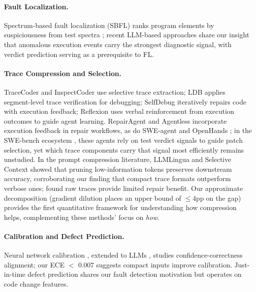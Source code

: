 \paragraph{Fault Localization.}
Spectrum-based fault localization (SBFL) ranks program elements by suspiciousness from test spectra \citep{abreu2007accuracy,jones2002visualization,wong2014dstar}; recent LLM-based approaches \citep{kang2024autofl,qin2024agentfl} share our insight that anomalous execution events carry the strongest diagnostic signal, with verdict prediction serving as a prerequisite to FL.

\paragraph{Trace Compression and Selection.}
TraceCoder \citep{huang2026tracecoder} and InspectCoder \citep{wang2025inspectcoder} use selective trace extraction; LDB \citep{zhong2024ldb} applies segment-level trace verification for debugging; SelfDebug \citep{chen2024selfdebug} iteratively repairs code with execution feedback; Reflexion \citep{shinn2023reflexion} uses verbal reinforcement from execution outcomes to guide agent learning. RepairAgent \citep{bouzenia2025repairagent} and Agentless \citep{xia2024agentless} incorporate execution feedback in repair workflows, as do SWE-agent \citep{yang2024sweagent} and OpenHands \citep{wang2025openhands}; in the SWE-bench ecosystem \citep{jimenez2024swebench}, these agents rely on test verdict signals to guide patch selection, yet which trace components carry that signal most efficiently remains unstudied.
In the prompt compression literature, LLMLingua \citep{jiang2023llmlingua} and Selective Context \citep{li2023selectivecontext} showed that pruning low-information tokens preserves downstream accuracy, corroborating our finding that compact trace formats outperform verbose ones; \citet{haque2025traces} found raw traces provide limited repair benefit.
Our approximate decomposition (gradient dilution places an upper bound of ${\leq}$4pp on the gap) provides the first quantitative framework for understanding how compression helps, complementing these methods' focus on \emph{how}.

\paragraph{Calibration and Defect Prediction.}
Neural network calibration \citep{guo2017calibration}, extended to LLMs \citep{kadavath2022language,geng2024calibration,spiess2025calibration}, studies confidence-correctness alignment; our ECE ${<}$ 0.007 suggests compact inputs improve calibration. Just-in-time defect prediction \citep{kamei2013large,hoang2019deepjit,pornprasit2021jitline} shares our fault detection motivation but operates on code change features.

